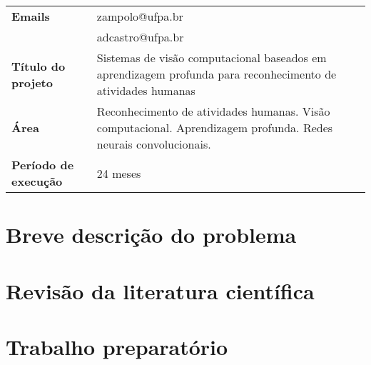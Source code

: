 \begin{table}[!th]
\begin{tabular}{|l p{}|}
\textbf{Emails}               & zampolo@ufpa.br\\
			      & adcastro@ufpa.br\\
\textbf{Título do projeto}    & Sistemas de visão computacional baseados em aprendizagem profunda para reconhecimento de atividades humanas\\
\textbf{Área}                 & Reconhecimento de atividades humanas. Visão computacional. Aprendizagem profunda. Redes neurais convolucionais.\\
\textbf{Período de execução}  & 24 meses\\
\hline
\end{tabular}
\end{table}
\newpage

\tableofcontents\newpage


%

\section{Breve descrição do problema}
\label{sec:descr}

\newpage

\section{Revisão da literatura científica}
\label{sec:rev}

\newpage

\section{Trabalho preparatório}
\label{sec:prep}
%
\newpage

